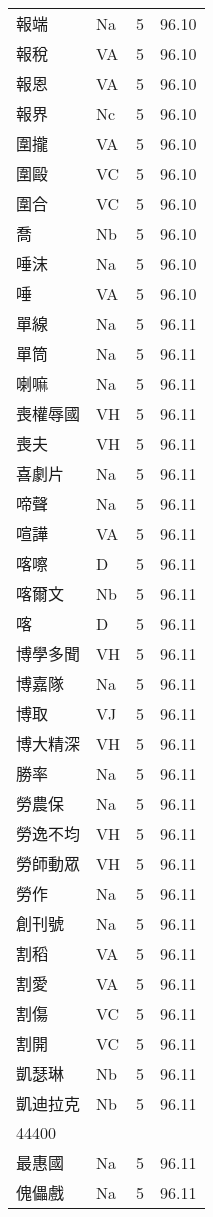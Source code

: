 \documentclass[twocolumn]{book}
\begin{document}
\begin{supertabular}{llrr}
報端 & Na & 5 &  96.10\\
報稅 & VA & 5 &  96.10\\
報恩 & VA & 5 &  96.10\\
報界 & Nc & 5 &  96.10\\
圍攏 & VA & 5 &  96.10\\
圍毆 & VC & 5 &  96.10\\
圍合 & VC & 5 &  96.10\\
喬 & Nb & 5 &  96.10\\
唾沫 & Na & 5 &  96.10\\
唾 & VA & 5 &  96.10\\
單線 & Na & 5 &  96.11\\
單筒 & Na & 5 &  96.11\\
喇嘛 & Na & 5 &  96.11\\
喪權辱國 & VH & 5 &  96.11\\
喪夫 & VH & 5 &  96.11\\
喜劇片 & Na & 5 &  96.11\\
啼聲 & Na & 5 &  96.11\\
喧譁 & VA & 5 &  96.11\\
喀嚓 & D & 5 &  96.11\\
喀爾文 & Nb & 5 &  96.11\\
喀 & D & 5 &  96.11\\
博學多聞 & VH & 5 &  96.11\\
博嘉隊 & Na & 5 &  96.11\\
博取 & VJ & 5 &  96.11\\
博大精深 & VH & 5 &  96.11\\
勝率 & Na & 5 &  96.11\\
勞農保 & Na & 5 &  96.11\\
勞逸不均 & VH & 5 &  96.11\\
勞師動眾 & VH & 5 &  96.11\\
勞作 & Na & 5 &  96.11\\
創刊號 & Na & 5 &  96.11\\
割稻 & VA & 5 &  96.11\\
割愛 & VA & 5 &  96.11\\
割傷 & VC & 5 &  96.11\\
割開 & VC & 5 &  96.11\\
凱瑟琳 & Nb & 5 &  96.11\\
凱迪拉克 & Nb & 5 &  96.11\\
44400\\
最惠國 & Na & 5 &  96.11\\
傀儡戲 & Na & 5 &  96.11\\

\end{supertabular}
\end{document}
